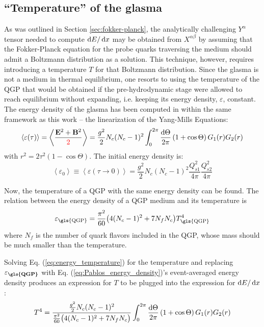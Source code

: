 \subsection{``Temperature'' of the glasma}
\label{sec:temperature}
As was outlined in Section \ref{sec:fokker-planck}, the analytically challenging $Y^\alpha$ tensor needed to compute $\mathop{}\!\mathrm{d} E / \mathop{}\!\mathrm{d} x$ may be obtained from $X^{\alpha \beta}$ by assuming that the Fokker-Planck equation for the probe quarks traversing the medium should admit a Boltzmann distribution as a solution. This technique, however, requires  introducing a temperature $T$ for that Boltzmann distribution. Since the glasma is not a medium in thermal equilibrium, one resorts to using the temperature of the \gls{QGP} that would be obtained if the pre-hydrodynamic stage were allowed to reach equilibrium without expanding, i.e. keeping its energy density, $\varepsilon$, constant. The energy density of the glasma has been computed in \cite{Guerrero_Rodr_guez_2021} within the same framework as this work -- the linearization of the Yang-Mills Equations:
\begin{equation}
	\left< \varepsilon (\tau) \right> = \left< \frac{\mathbf{E}^2 + \mathbf{B}^2}{\textcolor{red}{2}} \right>= \frac{g^2}{2} N_c (N_c - 1)^2 \int_0^{2\pi} \frac{\mathop{}\!\mathrm{d} \Theta}{2 \pi} \left(1 + \cos \Theta \right) G_1(r) G_2(r)
	\label{eq:Pablos_energy_density}
\end{equation}
with $r^2 = 2 \tau^2 (1 - \cos \Theta)$. The initial energy density is:
\begin{equation}
	\left< \varepsilon_0 \right> \equiv \left< \varepsilon(\tau \to 0) \right> = \frac{g^2}{2} N_c (N_c - 1)^2 \frac{Q_{s1}^2}{4 \pi} \frac{Q_{s2}^2}{4\pi}
\end{equation}

Now, the temperature of a \gls{QGP} with the same energy density can be found. The relation between the energy density of a \gls{QGP} medium and its temperature  is \cite{Carrington_2022} 
\begin{equation}
	\varepsilon_\text{\gls{QGP}} = \frac{\pi^2}{60} \big( 4(N_c - 1)^2 + 7 N_f N_c \big) T_\text{\gls{QGP}}^4 
	\label{eq:energy_temperature}
\end{equation} 
where $N_f$ is the number of quark flavors included in the \gls{QGP}, whose mass should be much smaller than the temperature.

Solving Eq. (\ref{eq:energy_temperature}) for the temperature and replacing $\varepsilon_\textbf{\gls{QGP}}$ with Eq. (\ref{eq:Pablos_energy_density})'s event-averaged energy density produces an expression for $T$ to be plugged into the expression for $\mathop{}\!\mathrm{d} E / \mathop{}\!\mathrm{d} x$:
\begin{equation}
	T^4 = \frac{\frac{g^2}{2} N_c (N_c - 1)^2}{\frac{\pi^2}{60} \big( 4(N_c - 1)^2 + 7 N_f N_c \big)} \int_0^{2\pi} \frac{\mathop{}\!\mathrm{d} \Theta}{2 \pi} \left(1 + \cos \Theta \right) G_1(r) G_2(r)
	\label{eq:final_full_T}
\end{equation}


